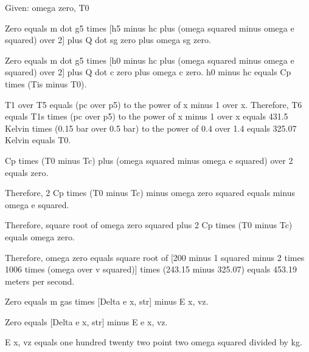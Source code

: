 Given: omega zero, T0

Zero equals m dot g5 times [h5 minus hc plus (omega squared minus omega e squared) over 2] plus Q dot sg zero plus omega sg zero.

Zero equals m dot g5 times [h0 minus hc plus (omega squared minus omega e squared) over 2] plus Q dot c zero plus omega c zero. h0 minus hc equals Cp times (Tis minus T0).

T1 over T5 equals (pc over p5) to the power of x minus 1 over x. Therefore, T6 equals T1s times (pc over p5) to the power of x minus 1 over x equals 431.5 Kelvin times (0.15 bar over 0.5 bar) to the power of 0.4 over 1.4 equals 325.07 Kelvin equals T0.

Cp times (T0 minus Tc) plus (omega squared minus omega e squared) over 2 equals zero.

Therefore, 2 Cp times (T0 minus Tc) minus omega zero squared equals minus omega e squared.

Therefore, square root of omega zero squared plus 2 Cp times (T0 minus Tc) equals omega zero.

Therefore, omega zero equals square root of [200 minus 1 squared minus 2 times 1006 times (omega over v squared)] times (243.15 minus 325.07) equals 453.19 meters per second.

Zero equals m gas times [Delta e x, str] minus E x, vz.

Zero equals [Delta e x, str] minus E e x, vz.

E x, vz equals one hundred twenty two point two omega squared divided by kg.